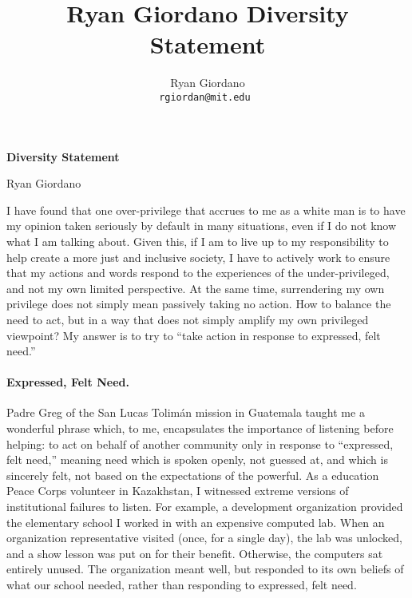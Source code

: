 
\usepackage{enumitem}

\usepackage{geometry}
\geometry{top=0.5in}
\geometry{left=1.0in}
\geometry{right=1.0in}


\title{Ryan Giordano Diversity Statement}

\author{
  Ryan Giordano \\ \texttt{rgiordan@mit.edu }
}



\begin{minipage}[t]{0.5\textwidth}
\hspace{-2em} %
{\bf \LARGE Diversity Statement}\\
\end{minipage}
\begin{minipage}[t]{0.5\textwidth}
        \hspace{8em} %
        {\LARGE Ryan Giordano}
\end{minipage}




I have found that one over-privilege that accrues to me as a white man is to
have my opinion taken seriously by default in many situations, even if I do not
know what I am talking about.  Given this, if I am to live up to my
responsibility to help create a more just and inclusive society, I have to
actively work to ensure that my actions and words respond to the experiences of
the under-privileged, and not my own limited perspective. At the same time,
surrendering my own privilege does not simply mean passively taking no action.
How to balance the need to act, but in a way that does not simply amplify my own
privileged viewpoint?   My answer is to try to ``take action in response to
expressed, felt need.''


\paragraph{Expressed, Felt Need.}
%
Padre Greg of the San Lucas Tolimán mission in Guatemala taught me a wonderful
phrase which, to me, encapsulates the importance of listening before helping: to
act on behalf of another community only in response to ``expressed, felt need,''
meaning need which is spoken openly, not guessed at, and which is sincerely
felt, not based on the expectations of the powerful.  As a education Peace Corps
volunteer in Kazakhstan, I witnessed extreme versions of institutional failures
to listen. For example, a development organization provided the elementary
school I worked in with an expensive computed lab.  When an organization
representative visited (once, for a single day), the lab was unlocked, and a
show lesson was put on for their benefit.  Otherwise, the computers sat entirely
unused. The organization meant well, but responded to its own beliefs of what
our school needed, rather than responding to expressed, felt need.

